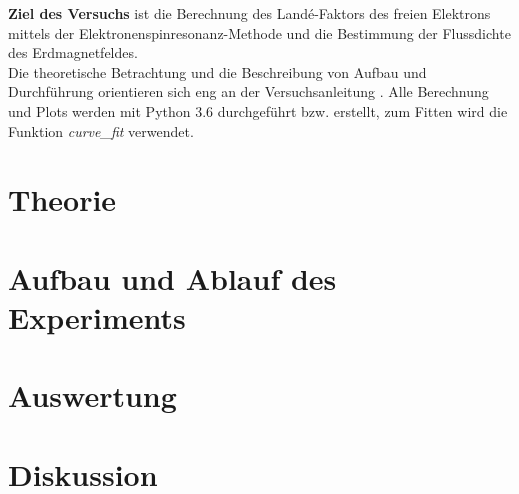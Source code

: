 \documentclass[a4,11pt]{article}
\newcommand{\V}{V28}
\begin{document}



\tableofcontents
\clearpage

\textbf{Ziel des Versuchs} ist die Berechnung des Landé-Faktors des freien Elektrons mittels der Elektronenspinresonanz-Methode und die Bestimmung der Flussdichte des Erdmagnetfeldes. \\
Die theoretische Betrachtung und die Beschreibung von Aufbau und Durchführung orientieren sich eng an der Versuchsanleitung \cite{V28}. Alle Berechnung und Plots werden mit Python 3.6 durchgeführt bzw. erstellt, zum Fitten wird die Funktion \textit{curve\_fit} verwendet.


\section{Theorie}

\clearpage


\section{Aufbau und Ablauf des Experiments}

\clearpage


\section{Auswertung}

\clearpage


\section{Diskussion}


\clearpage
\listoftodos
\listoffigures
\listoftables
\clearpage
\nocite{\V}
\printbibliography[title = Literaturverzeichnis]
\end{document}
